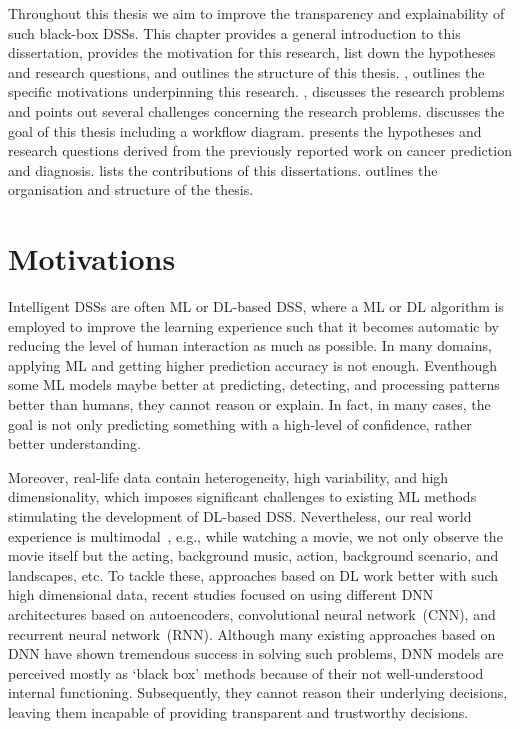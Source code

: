 \hspace*{3.5mm} Throughout this thesis we aim to improve the transparency and explainability of such black-box DSSs. This chapter provides a general introduction to this dissertation, provides the motivation for this research, list down the hypotheses and research questions, and outlines the structure of this thesis. 
, outlines the specific motivations underpinning this research. , discusses the research problems and points out several challenges concerning the research problems.  discusses the goal of this thesis including a workflow diagram.  presents the hypotheses and research questions derived from the previously reported work on cancer prediction and diagnosis.  lists the contributions of this dissertations.  outlines the organisation and structure of the thesis.


\section{Motivations}\label{motivations}
Intelligent DSSs are often ML or DL-based DSS, where a ML or DL algorithm is employed to improve the learning experience such that it becomes automatic by reducing the level of human interaction as much as possible. In many domains, applying ML and getting higher prediction accuracy is not enough. Eventhough some ML models maybe better at predicting, detecting, and processing patterns better than humans, they cannot reason or explain. In fact, in many cases, the goal is not only predicting something with a high-level of confidence, rather better understanding. 

\hspace*{3.5mm} Moreover, real-life data contain heterogeneity, high variability, and high dimensionality, which imposes significant challenges to existing ML methods stimulating the development of DL-based DSS. Nevertheless, our real world experience is multimodal~\cite{mmsurvey}, e.g., while watching a movie, we not only observe the movie itself but the acting, background music, action, background scenario, and landscapes, etc. To tackle these, approaches based on DL work better with such high dimensional data, recent studies focused on using different DNN architectures based on autoencoders, convolutional neural network~(CNN), and recurrent neural network~(RNN). Although many existing approaches based on DNN have shown tremendous success in solving such problems, DNN models are perceived mostly as `black box' methods because of their not well-understood internal functioning. Subsequently, they cannot reason their underlying decisions, leaving them incapable of providing transparent and trustworthy decisions. 

